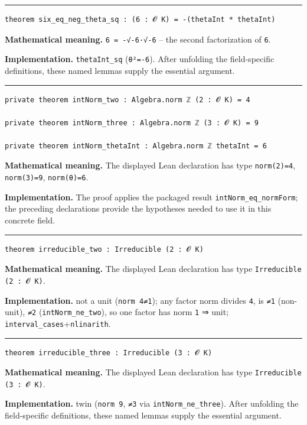 \documentclass[UTF8,a4paper,11pt,fontset=fandol]{ctexart}
\theoremstyle{definition}
\newcommand{\statementsep}{\par\medskip\hrule\medskip}
\begin{document}
\statementsep
\begin{verbatim}
theorem six_eq_neg_theta_sq : (6 : 𝓞 K) = -(thetaInt * thetaInt)
\end{verbatim}
\noindent\textbf{Mathematical meaning.} \texttt{6 = -√-6·√-6} -- the second factorization of \texttt{6}.\par
\noindent\textbf{Implementation.} \texttt{thetaInt\_\allowbreak{}sq} (\texttt{θ²=-6}). After unfolding the field-specific definitions, these named lemmas supply the essential argument.\par
\statementsep
\begin{verbatim}
private theorem intNorm_two : Algebra.norm ℤ (2 : 𝓞 K) = 4

private theorem intNorm_three : Algebra.norm ℤ (3 : 𝓞 K) = 9

private theorem intNorm_thetaInt : Algebra.norm ℤ thetaInt = 6
\end{verbatim}
\noindent\textbf{Mathematical meaning.} The displayed Lean declaration has type \texttt{norm(2)=4}, \texttt{norm(3)=9}, \texttt{norm(θ)=6}.\par
\noindent\textbf{Implementation.} The proof applies the packaged result \texttt{intNorm\_\allowbreak{}eq\_\allowbreak{}normForm}; the preceding declarations provide the hypotheses needed to use it in this concrete field.\par
\statementsep
\begin{verbatim}
theorem irreducible_two : Irreducible (2 : 𝓞 K)
\end{verbatim}
\noindent\textbf{Mathematical meaning.} The displayed Lean declaration has type \texttt{Irreducible (2 : 𝓞 K)}.\par
\noindent\textbf{Implementation.} not a unit (\texttt{norm 4≠1}); any factor norm divides \texttt{4}, is \texttt{≠1} (non-unit), \texttt{≠2} (\texttt{intNorm\_\allowbreak{}ne\_\allowbreak{}two}), so one factor has norm \texttt{1} ⇒ unit; \texttt{interval\_\allowbreak{}cases}+\texttt{nlinarith}.\par
\statementsep
\begin{verbatim}
theorem irreducible_three : Irreducible (3 : 𝓞 K)
\end{verbatim}
\noindent\textbf{Mathematical meaning.} The displayed Lean declaration has type \texttt{Irreducible (3 : 𝓞 K)}.\par
\noindent\textbf{Implementation.} twin (\texttt{norm 9}, \texttt{≠3} via \texttt{intNorm\_\allowbreak{}ne\_\allowbreak{}three}). After unfolding the field-specific definitions, these named lemmas supply the essential argument.\par
\end{document}
